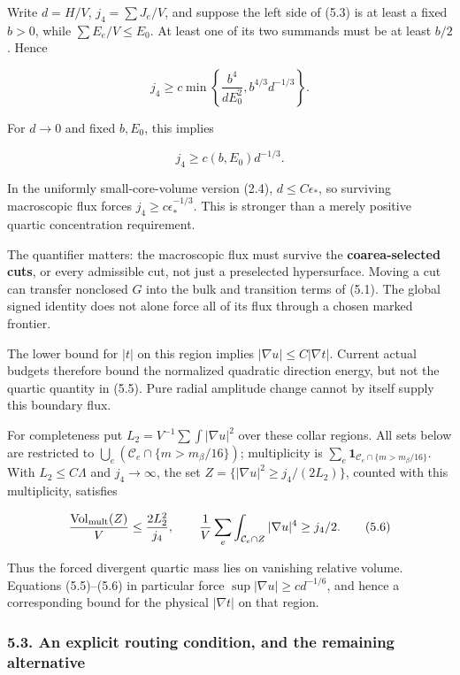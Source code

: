 \documentclass[
  10pt,
]{article}
\begin{document}
Write \(d=H/V\), \(j_4=\sum J_e/V\), and suppose the left side of (5.3)
is at least a fixed \(b>0\), while \(\sum E_e/V\le E_0\). At least one
of its two summands must be at least \(b/2\). Hence

\[
 j_4\ge c\min\left\{\frac{b^4}{dE_0^2},
                               b^{4/3}d^{-1/3}\right\}.
 \tag{5.4}
\]

For \(d\to0\) and fixed \(b,E_0\), this implies

\[
                 \boxed{j_4\ge c(b,E_0)d^{-1/3}.}
 \tag{5.5}
\]

In the uniformly small-core-volume version (2.4), \(d\le C\epsilon_*\),
so surviving macroscopic flux forces \(j_4\ge c\epsilon_*^{-1/3}\). This
is stronger than a merely positive quartic concentration requirement.

The quantifier matters: the macroscopic flux must survive the
\textbf{coarea-selected cuts}, or every admissible cut, not just a
preselected hypersurface. Moving a cut can transfer nonclosed \(G\) into
the bulk and transition terms of (5.1). The global signed identity does
not alone force all of its flux through a chosen marked frontier.

The lower bound for \(|t|\) on this region implies
\(|\nabla u|\le C|\nabla t|\). Current actual budgets therefore bound
the normalized quadratic direction energy, but not the quartic quantity
in (5.5). Pure radial amplitude change cannot by itself supply this
boundary flux.

For completeness put \(L_2=V^{-1}\sum\int|\nabla u|^2\) over these
collar regions. All sets below are restricted to
\(\bigcup_e(\mathcal C_e\cap\{m>m_\beta/16\})\); multiplicity is
\(\sum_e\mathbf1_{\mathcal C_e\cap\{m>m_\beta/16\}}\). With
\(L_2\le C\Lambda\) and \(j_4\to\infty\), the set
\(Z=\{|\nabla u|^2\ge j_4/(2L_2)\}\), counted with this multiplicity,
satisfies

\[
 \frac{\operatorname{Vol}_{\rm mult}(Z)}V
        \le\frac{2L_2^2}{j_4},\qquad
 \frac1V\sum_e\int_{\mathcal C_e\cap Z}|\nabla u|^4\ge j_4/2.
 \tag{5.6}
\]

Thus the forced divergent quartic mass lies on vanishing relative
volume. Equations (5.5)--(5.6) in particular force
\(\sup|\nabla u|\ge c d^{-1/6}\), and hence a corresponding bound for
the physical \(|\nabla t|\) on that region.

\hypertarget{an-explicit-routing-condition-and-the-remaining-alternative}{%
\subsubsection{5.3. An explicit routing condition, and the remaining
alternative}\label{an-explicit-routing-condition-and-the-remaining-alternative}}
\end{document}
